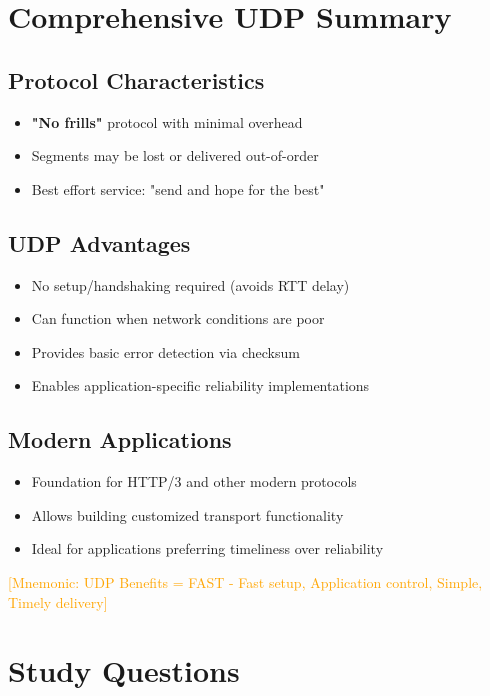 \documentclass[12pt]{article}
\begin{document}
\section{Comprehensive UDP Summary}

\subsection{Protocol Characteristics}
\begin{itemize}
    \item \textbf{"No frills"} protocol with minimal overhead
    \item Segments may be lost or delivered out-of-order
    \item Best effort service: "send and hope for the best"
\end{itemize}

\subsection{UDP Advantages}
\begin{itemize}
    \item No setup/handshaking required (avoids RTT delay)
    \item Can function when network conditions are poor
    \item Provides basic error detection via checksum
    \item Enables application-specific reliability implementations
\end{itemize}

\subsection{Modern Applications}
\begin{itemize}
    \item Foundation for HTTP/3 and other modern protocols
    \item Allows building customized transport functionality
    \item Ideal for applications preferring timeliness over reliability
\end{itemize}

\textcolor{orange}{[Mnemonic: UDP Benefits = FAST - Fast setup, Application control, Simple, Timely delivery]}

\section{Study Questions}
\end{document}
